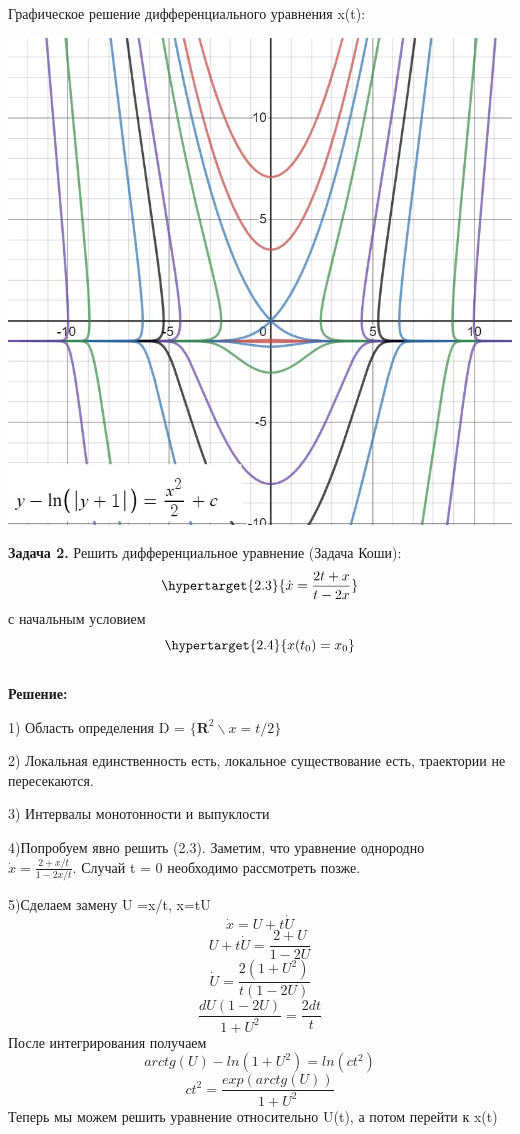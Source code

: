 \documentclass[10pt]{report}
\begin{document}
Графическое решение дифференциального уравнения x(t):
\begin{center}
{\includegraphics[scale=0.45]{graph2.4.jpg}} 
\end{center}
\textbf{Задача 2.} Решить дифференциальное уравнение (Задача Коши): 
\newline
\begin{equation}
\hypertarget{2.3}{\dot{x} =  \frac {2t+x} {t-2x}}
\end{equation}
\newline
с начальным условием
\newline
\begin{equation}
\hypertarget{2.4}{x(t_0)=x_0}
\end{equation}\\
\textbf{Решение:} \par
1) Область определения D = $\{ \textbf {R}^2 \backslash x=t/2\}$

2) Локальная единственность есть, локальное существование есть, траектории не пересекаются.

3) Интервалы монотонности и выпуклости

4)Попробуем явно решить (2.3). Заметим, что уравнение однородно\\
$\dot{x} =  \frac {2+x/t} {1-2x/t}$. Случай t = 0 необходимо рассмотреть позже.

5)Сделаем замену U =x/t, x=tU\\
\[
\dot{x} = U+ t\dot{U}
\]
\[
 U+ t\dot{U} = \frac {2+U} {1-2U}
\]
\[
\dot{U} = \frac {2(1+U^2)} {t(1-2U)}
\]
\[
\frac {dU(1-2U)} {1+U^2} = \frac {2dt} t
\]
После интегрирования получаем
\[
arctg(U)-ln(1+U^2)=ln(ct^2)
\]
\[
ct^2=\frac {exp(arctg(U))} {1+U^2}\]
Теперь мы можем решить уравнение относительно U(t), а потом перейти к x(t)
\end{document}
